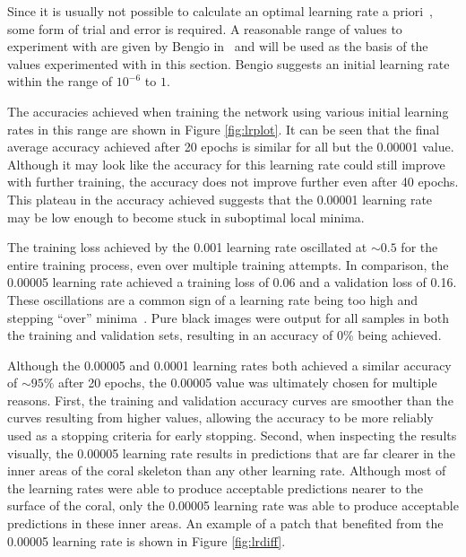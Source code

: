 Since it is usually not possible to calculate an optimal learning rate a priori~\cite{neuralbook}, some form of trial and error is required. A reasonable range of values to experiment with are given by Bengio in~\cite{bengio2012practical} and will be used as the basis of the values experimented with in this section. Bengio suggests an initial learning rate within the range of $10^{-6}$ to $1$.

The accuracies achieved when training the network using various initial learning rates in this range are shown in Figure \ref{fig:lrplot}. It can be seen that the final average accuracy achieved after 20 epochs is similar for all but the 0.00001 value. Although it may look like the accuracy for this learning rate could still improve with further training, the accuracy does not improve further even after 40 epochs. This plateau in the accuracy achieved suggests that the 0.00001 learning rate may be low enough to become stuck in suboptimal local minima.

The training loss achieved by the 0.001 learning rate oscillated at ${\sim}0.5$ for the entire training process, even over multiple training attempts. In comparison, the 0.00005 learning rate achieved a training loss of 0.06 and a validation loss of 0.16. These oscillations are a common sign of a learning rate being too high and stepping ``over'' minima~\cite{bishop1995neural}. Pure black images were output for all samples in both the training and validation sets, resulting in an accuracy of 0\% being achieved.

Although the 0.00005 and 0.0001 learning rates both achieved a similar accuracy of ${\sim}95\%$ after 20 epochs, the 0.00005 value was ultimately chosen for multiple reasons. First, the training and validation accuracy curves are smoother than the curves resulting from higher values, allowing the accuracy to be more reliably used as a stopping criteria for early stopping. Second, when inspecting the results visually, the 0.00005 learning rate results in predictions that are far clearer in the inner areas of the coral skeleton than any other learning rate. Although most of the learning rates were able to produce acceptable predictions nearer to the surface of the coral, only the 0.00005 learning rate was able to produce acceptable predictions in these inner areas. An example of a patch that benefited from the 0.00005 learning rate is shown in Figure \ref{fig:lrdiff}.

